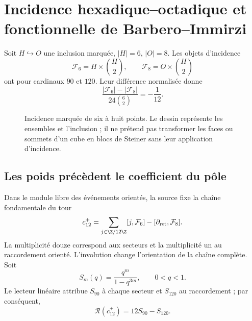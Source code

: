 \section{Incidence hexadique--octadique et fonctionnelle de Barbero--Immirzi}
\label{v:ant:sec:barbero}
Soit $H\hookrightarrow O$ une inclusion marquée, $|H|=6$, $|O|=8$.
Les objets d'incidence
\[
\mathcal F_6=H\times\binom H2,\qquad
\mathcal F_8=O\times\binom H2
\]
ont pour cardinaux $90$ et $120$. Leur différence normalisée donne
\[
\frac{|\mathcal F_6|-|\mathcal F_8|}{24\binom62}=-\frac1{12}.
\]
\begin{figure}[htbp]
\centering
{}
\caption{Incidence marquée de six à huit points. Le dessin représente
les ensembles et l'inclusion ; il ne prétend pas transformer les faces ou sommets
d'un cube en blocs de Steiner sans leur application d'incidence.}
\end{figure}

\subsection{Les poids précèdent le coefficient du pôle}
Dans le module libre des événements orientés, la source fixe la chaîne fondamentale du tour
\[
c_{12}^{+}=
\sum_{j\in\Z/12\Z}[j,\mathcal F_6]
-[\partial_{\rm ret},\mathcal F_8].
\]
La multiplicité douze correspond aux secteurs et la multiplicité un
au raccordement orienté. L'involution change l'orientation de la chaîne
complète. Soit
\[
S_m(q)=\frac{q^m}{1-q^{3m}},\qquad 0<q<1.
\]
Le lecteur linéaire attribue $S_{90}$ à chaque secteur et $S_{120}$ au raccordement ;
par conséquent,
\[
\mathscr R(c_{12}^{+})=12S_{90}-S_{120}.
\]

